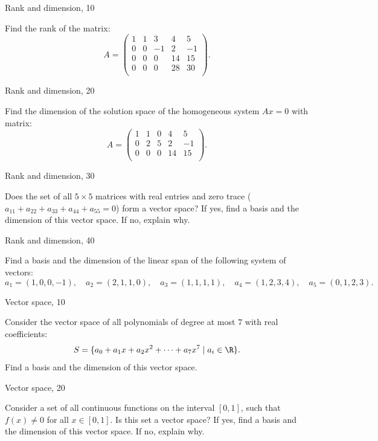 \newpage
Rank and dimension, 10
 
    Find the rank of the matrix:
   $$
   A =\begin{pmatrix}
       1 & 1 & 3 & 4 & 5 \\
       0 & 0 & -1 & 2 & -1 \\
       0 & 0 & 0 & 14 & 15 \\
       0 & 0 & 0 & 28 & 30 \\
   \end{pmatrix}.
   $$
   

   \newpage   
Rank and dimension, 20


 
    Find the dimension of the solution space of the homogeneous system $A x = 0$ with matrix:
   $$
   A =\begin{pmatrix}
   1 & 1 & 0 & 4 & 5 \\
   0 & 2 & 5 & 2 & -1 \\
   0 & 0 & 0 & 14 & 15 \\
\end{pmatrix}.
   $$
 

 \newpage
Rank and dimension, 30

 
    Does the set of all $5 \times 5$ matrices with real entries and zero trace ($a_{11} + a_{22} + a_{33} + a_{44} + a_{55} = 0$) form a vector space? If yes, find a basis and the dimension of this vector space. If no, explain why.
    

\newpage
Rank and dimension, 40

    
        Find a basis and the dimension of the linear span of the following system of vectors:
    $$a_1=(1,0,0,-1), \quad a_2=(2,1,1,0), \quad a_3=(1,1,1,1), \quad a_4=(1,2,3,4), \quad a_5=(0,1,2,3).$$
    

\newpage
Vector space, 10

    Consider the vector space of all polynomials of degree at most $7$ with real coefficients:
    $$
    S = \{a_0 + a_1 x + a_2 x^2 + \cdots + a_7 x^7 \mid a_i \in \R\}.
    $$
    Find a basis and the dimension of this vector space.
    

    \newpage
Vector space, 20


    
    Consider a set of all continuous functions on the interval $[0, 1]$, such that $f(x) \neq 0$ for all $x \in [0, 1]$. Is this set a vector space? If yes, find a basis and the dimension of this vector space. If no, explain why.
    
